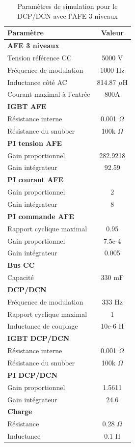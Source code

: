 \begin{table}[htb]
\centering
\begin{tabular}{|l|c|} 
  \hline
  \textbf{Paramètre} & \textbf{Valeur}  \\
  \hline\hline \hline
  \multicolumn{2}{|l|}{\textbf{AFE 3 niveaux}}\\ \hline \hline 
  Tension référence CC & 5000 V\\ \hline
  Fréquence de modulation & 1000 Hz \\ \hline
  Inductance côté AC& 814.87 $\mu$H\\ \hline
  Courant maximal à l'entrée& 800A \\ \hline \hline
  \multicolumn{2}{|l|}{\textbf{IGBT AFE}}\\ \hline
  Résistance interne & 0.001 $\Omega$\\
  Résistance du snubber & 100k $\Omega$\\ \hline \hline
   \multicolumn{2}{|l|}{\textbf{PI tension AFE}}\\ \hline
  Gain proportionnel & 282.9218 \\
  Gain intégrateur & 92.59 \\ \hline \hline
  \multicolumn{2}{|l|}{\textbf{PI courant AFE}}\\ \hline
  Gain proportionnel & 2 \\
  Gain intégrateur & 8 \\ \hline \hline
  \multicolumn{2}{|l|}{\textbf{PI commande AFE}}\\ \hline
  Rapport cyclique maximal & 0.95\\
  Gain proportionnel & 7.5e-4 \\
  Gain intégrateur & 0.005 \\ \hline \hline
  \multicolumn{2}{|l|}{\textbf{Bus CC}}\\ \hline
  Capacité & 330 mF\\
  \hline \hline \hline
  
  \multicolumn{2}{|l|}{\textbf{DCP/DCN}}\\ \hline \hline
  Fréquence de modulation & 333 Hz\\ \hline
  Rapport cyclique maximal & 1 \\ \hline
  Inductance de couplage & 10e-6 H \\ \hline \hline
  \multicolumn{2}{|l|}{\textbf{IGBT DCP/DCN}}\\ \hline
  Résistance interne & 0.001 $\Omega$\\
  Résistance du snubber & 100k $\Omega$\\ \hline \hline
   \multicolumn{2}{|l|}{\textbf{PI DCP/DCN}}\\ \hline
  Gain proportionnel & 1.5611 \\
  Gain intégrateur & 24.6 \\ \hline \hline
  \multicolumn{2}{|l|}{\textbf{Charge}}\\ \hline
  Résistance & 0.28 $\Omega$\\
  Inductance & 0.1 H \\
  \hline
\end{tabular}
\caption{Paramètres de simulation pour le DCP/DCN avec l'AFE 3 niveaux}
\label{p_AF_DCP}
\end{table}
\clearpage

